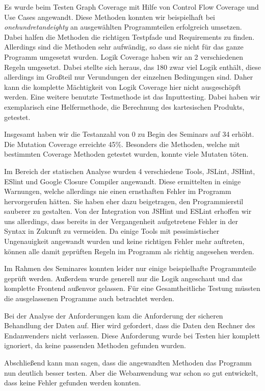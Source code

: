\documentclass[ngerman]{article}
\begin{document}
Es wurde beim Testen Graph Coverage mit Hilfe von Control Flow Coverage und Use Cases angewandt. Diese Methoden konnten wir beispielhaft bei \emph{onehundretandeighty} an ausgewählten Programmteilen erfolgreich umsetzen. Dabei halfen die Methoden die richtigen Testpfade und Requirements zu finden. Allerdings sind die Methoden sehr aufwändig, so dass sie nicht für das ganze Programm umgesetzt wurden. Logik Coverage haben wir an 2 verschiedenen Regeln umgesetzt. Dabei stellte sich heraus, das 180 zwar viel Logik enthält, diese allerdings im Großteil nur Verundungen der einzelnen Bedingungen sind. Daher kann die komplette Mächtigkeit von Logik Coverage hier nicht ausgeschöpft werden.
Eine weitere benutzte Testmethode ist das Inputtesting. Dabei haben wir exemplarisch eine Helfermethode, die Berechnung des kartesischen Produkts, getestet.  

Insgesamt haben wir die Testanzahl von 0 zu Begin des Seminars auf 34 erhöht. Die Mutation Coverage erreichte 45\%. Besonders die Methoden, welche mit bestimmten Coverage Methoden getestet wurden, konnte viele Mutaten töten.

Im Bereich der statischen Analyse wurden 4 verschiedene Tools, JSLint, JSHint, ESlint und Google Closure Compiler angewandt. Diese ermittelten in einige Warnungen, welche allerdings nie einen ernsthaften Fehler im Programm hervorgerufen hätten. Sie haben eher dazu beigetragen, den Programmierstil sauberer zu gestalten. Von der Integration von JSHint und ESLint erhoffen wir uns allerdings, dass bereits in der Vergangenheit aufgetretene Fehler in der Syntax in Zukunft zu vermeiden. Da einige Tools mit pessimistischer Ungenauigkeit angewandt wurden und keine richtigen Fehler mehr auftreten, können alle damit geprüften Regeln im Programm als richtig angesehen werden.

Im Rahmen des Seminares konnten leider nur einige beispielhafte Programmteile geprüft werden. Außerdem wurde generell nur die Logik angeschaut und das komplette Frontend außenvor gelassen. Für eine Gesamtheitliche Testung müssten die ausgelassenen Programme auch betrachtet werden.

Bei der Analyse der Anforderungen kam die Anforderung der sicheren Behandlung der Daten auf. Hier wird gefordert, dass die Daten den Rechner des Endanwenders nicht verlassen. Diese Anforderung wurde bei Testen hier komplett ignoriert, da keine passenden Methoden gefunden wurden.

Abschließend kann man sagen, dass die angewandten Methoden das Programm nun deutlich besser testen.
Aber die Webanwendung war schon so gut entwickelt, dass keine Fehler gefunden werden konnten.
\end{document}
